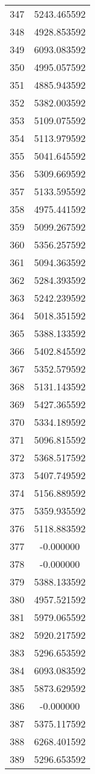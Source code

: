 \documentclass[12pt]{article}
\begin{document}
\begin{longtable}{@{}cc@{}}
347 & 5243.465592 \\
348 & 4928.853592 \\
349 & 6093.083592 \\
350 & 4995.057592 \\
351 & 4885.943592 \\
352 & 5382.003592 \\
353 & 5109.075592 \\
354 & 5113.979592 \\
355 & 5041.645592 \\
356 & 5309.669592 \\
357 & 5133.595592 \\
358 & 4975.441592 \\
359 & 5099.267592 \\
360 & 5356.257592 \\
361 & 5094.363592 \\
362 & 5284.393592 \\
363 & 5242.239592 \\
364 & 5018.351592 \\
365 & 5388.133592 \\
366 & 5402.845592 \\
367 & 5352.579592 \\
368 & 5131.143592 \\
369 & 5427.365592 \\
370 & 5334.189592 \\
371 & 5096.815592 \\
372 & 5368.517592 \\
373 & 5407.749592 \\
374 & 5156.889592 \\
375 & 5359.935592 \\
376 & 5118.883592 \\
377 & -0.000000 \\
378 & -0.000000 \\
379 & 5388.133592 \\
380 & 4957.521592 \\
381 & 5979.065592 \\
382 & 5920.217592 \\
383 & 5296.653592 \\
384 & 6093.083592 \\
385 & 5873.629592 \\
386 & -0.000000 \\
387 & 5375.117592 \\
388 & 6268.401592 \\
389 & 5296.653592 \\

\end{longtable}
\end{document}
